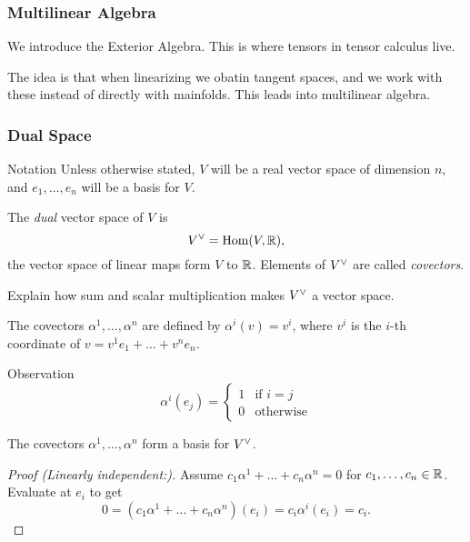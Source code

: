 \begin{frame}
  \frametitle{Multilinear Algebra}
  We introduce the Exterior Algebra. This is where tensors in tensor calculus
  live.

  The idea is that when linearizing we obatin tangent spaces, and 
  we work with these instead of directly with mainfolds. This leads 
  into multilinear algebra.
\end{frame}
\begin{frame}
  \frametitle{Dual Space}
  \begin{block}
    {Notation}
    Unless otherwise stated, $V$ will be a real vector
    space of dimension $n$, and $e_1, \dots, e_n$ will be
    a basis for $V$.
  \end{block}
  \begin{definition}
    The {\em dual} vector space of $V$ is
    \begin{displaymath}
      V^\vee = \operatorname{Hom}(V, \mathbb R),
    \end{displaymath}
    the vector space of linear maps form $V$ to $\mathbb R$.
    Elements of $V^\vee$ are called {\em covectors}.
  \end{definition}
  \begin{exercise}
    Explain how sum and scalar multiplication makes $V^\vee$ a vector space.
  \end{exercise}
\end{frame}

\begin{frame}
  The covectors $\alpha^1, \dots, \alpha^n$ are defined by $\alpha^i(v) = v^i$, 
  where $v^i$ is the $i$-th coordinate of $v = v^1 e_1 + \dots + v^n e_n$.
  \begin{block}
    {Observation}
    \begin{displaymath}
      \alpha^i(e_j) = 
      \begin{cases}
        1 & \text{if $i = j$} \\
        0 & \text{otherwise}
      \end{cases}
    \end{displaymath}
  \end{block}
    \begin{prop}
      The covectors $\alpha^1, \dots, \alpha^n$ form a basis for $V^\vee$.
    \end{prop}
    \begin{proof}[Proof (Linearly independent:)]
      Assume $c_1 \alpha^1 + \dots + c_n \alpha^n = 0$
      for $c_1, \dots, c_n \in \mathbb R$. Evaluate at $e_i$ to get
      \begin{displaymath}
        0 = (c_1 \alpha^1 + \dots + c_n \alpha^n )(e_i) = c_i \alpha^i(e_i) =
        c_i.
      \end{displaymath}
    \end{proof}
\end{frame}

